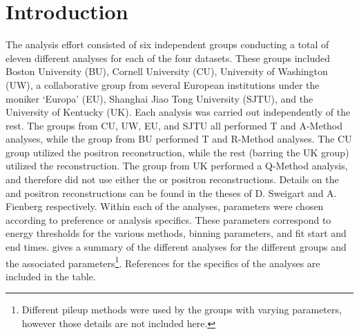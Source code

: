 
\graphicspath{{Body/Figures/}}

\clearpage
\section{Introduction}


The \Rone \wa analysis effort consisted of six independent groups conducting a total of eleven different analyses for each of the four \Rone datasets. These groups included Boston University (BU), Cornell University (CU), University of Washington (UW), a collaborative group from several European institutions under the moniker `Europa' (EU), Shanghai Jiao Tong University (SJTU), and the University of Kentucky (UK). Each analysis was carried out independently of the rest. The groups from CU, UW, EU, and SJTU all performed T and A-Method analyses, while the group from BU performed T and R-Method analyses. The CU group utilized the \RE positron reconstruction, while the rest (barring the UK group) utilized the \RW reconstruction. The group from UK performed a Q-Method analysis, and therefore did not use either the \RE or \RW positron reconstructions. Details on the \RE and \RW positron reconstructions can be found in the theses of D. Sweigart \cite{phdthesis:2020Sweigart} and A. Fienberg \cite{phdthesis:2019Fienberg} respectively. Within each of the analyses, parameters were chosen according to preference or analysis specifics. These parameters correspond to energy thresholds for the various methods, binning parameters, and fit start and end times.  gives a summary of the different analyses for the different groups and the associated parameters\footnote{Different pileup methods were used by the groups with varying parameters, however those details are not included here.}. References for the specifics of the analyses are included in the table.



